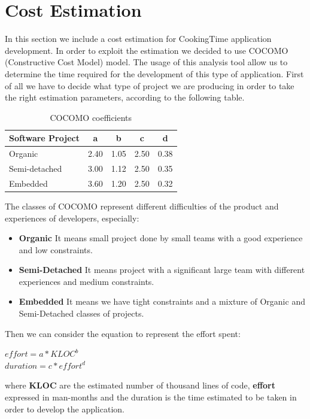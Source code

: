 \chapter{Cost Estimation}
In this section we include a cost estimation for CookingTime application development.
In order to exploit the estimation we decided to use COCOMO (Constructive Cost Model) model.
The usage of this analysis tool allow us to determine the time required for the development of this type of application.
First of all we have to decide what type of project we are producing in order to take the right estimation parameters, according to the following table.\\
\begin{table}[H]
	\centering
	\begin{tabular}{|l|c|c|c|c|}
	\hline
	\textbf{Software Project}& \textbf{a}& \textbf{b}& \textbf{c}& \textbf{d}\\
	\hline
	Organic & 2.40 & 1.05 & 2.50 & 0.38 \\
	\hline
	Semi-detached & 3.00 & 1.12 & 2.50 & 0.35 \\
	\hline
	Embedded & 3.60 & 1.20 & 2.50 & 0.32 \\
	\hline
	\end{tabular}
	\caption{COCOMO coefficients}
\end{table}
The classes of COCOMO represent different difficulties of the product and experiences of developers, especially:
\begin{itemize}
	\item \textbf{Organic} It means small project done by small teams with a good experience and low constraints.
	\item \textbf{Semi-Detached} It means project with a significant large team with different experiences and medium constraints.
	\item \textbf{Embedded} It means we have tight constraints and a mixture of Organic and Semi-Detached classes of projects.
\end{itemize}
Then we can consider the equation to represent the effort spent:\\
\begin{center}
$ effort = a * KLOC ^{b}$\\
$ duration = c * effort^{d}$\\
\end{center}
where \textbf{KLOC} are the estimated number of thousand lines of code, \textbf{effort} expressed in man-months and the duration is the time estimated to be taken in order to develop the application.\\
